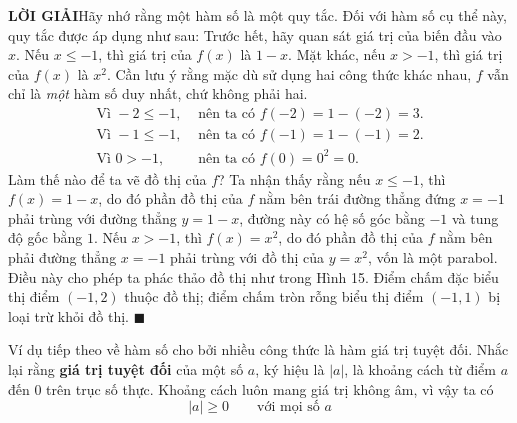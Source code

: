 \documentclass[10pt,letterpaper]{article}
\begin{document}
\begin{minipage}[t]{0.71\textwidth}
    \vspace{0.15cm}
    \noindent
    \textbf{\textsf{\color{stewartcyan}LỜI GIẢI}}\quad Hãy nhớ rằng một hàm số là một quy tắc. Đối với hàm số cụ thể này, quy tắc được áp dụng như sau: Trước hết, hãy quan sát giá trị của biến đầu vào $x$. Nếu $x \leqslant -1$, thì giá trị của $f(x)$ là $1 - x$. Mặt khác, nếu $x > -1$, thì giá trị của $f(x)$ là $x^2$. Cần lưu ý rằng mặc dù sử dụng hai công thức khác nhau, $f$ vẫn chỉ là \emph{một} hàm số duy nhất, chứ không phải hai.
    \begin{align*}
    \text{Vì } -2 \leqslant -1, &\text{ nên ta có } f(-2) = 1 - (-2) = 3.\\
    \text{Vì } -1 \leqslant -1, &\text{ nên ta có } f(-1) = 1 - (-1) = 2.\\
    \text{Vì } 0 > -1, &\text{ nên ta có } f(0) = 0^2 = 0.
    \end{align*}
    Làm thế nào để ta vẽ đồ thị của $f$? Ta nhận thấy rằng nếu $x \leqslant -1$, thì $f(x) = 1 - x$, do đó phần đồ thị của $f$ nằm bên trái đường thẳng đứng $x = -1$ phải trùng với đường thẳng $y = 1 - x$, đường này có hệ số góc bằng $-1$ và tung độ gốc bằng $1$. Nếu $x > -1$, thì $f(x) = x^2$, do đó phần đồ thị của $f$ nằm bên phải đường thẳng $x = -1$ phải trùng với đồ thị của $y = x^2$, vốn là một parabol. Điều này cho phép ta phác thảo đồ thị như trong Hình 15. Điểm chấm đặc biểu thị điểm $(-1, 2)$ thuộc đồ thị; điểm chấm tròn rỗng biểu thị điểm $(-1, 1)$ bị loại trừ khỏi đồ thị. \hfill{\color{stewartcyan}$\blacksquare$}

    \vspace{0.25cm}
    Ví dụ tiếp theo về hàm số cho bởi nhiều công thức là hàm giá trị tuyệt đối. Nhắc lại rằng \textbf{giá trị tuyệt đối} của một số $a$, ký hiệu là $|a|$, là khoảng cách từ điểm $a$ đến $0$ trên trục số thực. Khoảng cách luôn mang giá trị không âm, vì vậy ta có
    \[
    |a| \geqslant 0 \qquad \text{với mọi số } a
    \]
\end{minipage}
\end{document}
